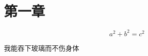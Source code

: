 
\section{第一章}\label{sec:1}

\begin{equation}
	\label{eq:1}
	a^2+b^2=c^2
\end{equation}

我能吞下玻璃而不伤身体


